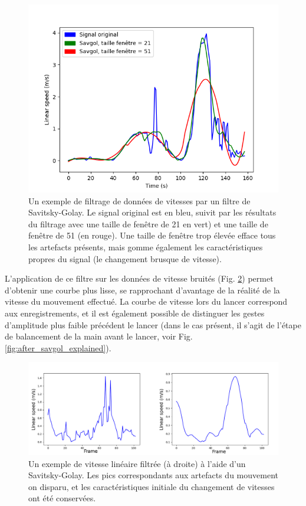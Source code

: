 \begin{figure}
	\centering
    \includegraphics[width=\textwidth]{pictures/savgol_comparison_all_3_at_once.png}
    \caption[Comparaison de l'influence des paramètres d'un filtre Savitsky-Golay]{Un exemple de filtrage de données de vitesses par un filtre de Savitsky-Golay. Le signal original est en bleu, suivit par les résultats du filtrage avec une taille de fenêtre de 21 en vert) et une taille de fenêtre de 51 (en rouge). Une taille de fenêtre trop élevée efface tous les artefacts présents, mais gomme également les caractéristiques propres du signal (le changement brusque de vitesse).}
    \label{savgol_comparison_all_3_at_once}
\end{figure}

L'application de ce filtre sur les données de vitesse bruités (Fig. \ref{fig:before_after_savgol}) permet d'obtenir une courbe plus lisse, se rapprochant d'avantage de la réalité de la vitesse du mouvement effectué. La courbe de vitesse lors du lancer correspond aux enregistrements, et il est également possible de distinguer les gestes d'amplitude plus faible précédent le lancer (dans le cas présent, il s'agit de l'étape de balancement de la main avant le lancer, voir Fig. \ref{fig:after_savgol_explained}).

\begin{figure}
	\centering
    \includegraphics[width=\textwidth]{pictures/before_after_savgol.png}
    \caption[Vitesses filtrées par un filtre de Savitsky-Golay]{Un exemple de vitesse linéaire filtrée (à droite) à l'aide d'un Savitsky-Golay. Les pics correspondants aux artefacts du mouvement on disparu, et les caractéristiques initiale du changement de vitesses ont été conservées.}
    \label{fig:before_after_savgol}
\end{figure}

